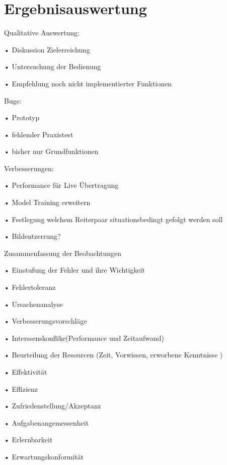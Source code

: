 \chapter{Ergebnisauswertung}
\label{ch:ergebnis}

Qualitative Auswertung:

•	Diskussion Zielerreichung

•	Untersuchung der Bedienung


•	Empfehlung noch nicht implementierter Funktionen

\vspace{1cm}

Bugs:

•	Prototyp

•	fehlender Praxistest

•	bisher nur Grundfunktionen

\vspace{1cm}

Verbesserungen:

•	Performance für Live Übertragung

•	Model Training erweitern

•	Festlegung welchem Reiterpaar situationsbedingt gefolgt werden soll

•	Bildentzerrung?


\vspace{1cm}
Zusammenfassung der Beobachtungen
	
	
•	Einstufung der Fehler und ihre Wichtigkeit

•	Fehlertoleranz

•	Ursachenanalyse
	
•	Verbesserungsvorschläge
	
•	Interssenskonflike(Performance und Zeitaufwand)
	
•	Beurteilung der Resourcen (Zeit, Vorwissen, erworbene Kenntnisse )

•	Effektivität

•	Effizienz

•	Zufriedenstellung/Akzeptanz

•	Aufgabenangemessenheit

•	Erlernbarkeit

•	Erwartungskonformität



